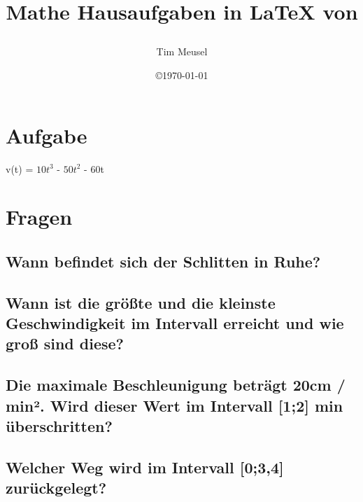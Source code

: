 \documentclass[a4paper,11pt]{scrartcl}
\author{Tim Meusel}
\title{Mathe Hausaufgaben in \LaTeX{} von \author{}}
\date{\copyright\today}
\begin{document}
\maketitle

\section{Aufgabe}

v(t) = $10t^3$ - $50t^2$ - 60t

\section{Fragen}

\subsection{Wann befindet sich der Schlitten in Ruhe?}

\subsection{Wann ist die größte und die kleinste Geschwindigkeit im Intervall erreicht und wie groß sind diese?}

\subsection{Die maximale Beschleunigung beträgt 20cm / min². Wird dieser Wert im Intervall [1;2] min überschritten?
}
\subsection{Welcher Weg wird im Intervall [0;3,4] zurückgelegt?}
\end{document}
